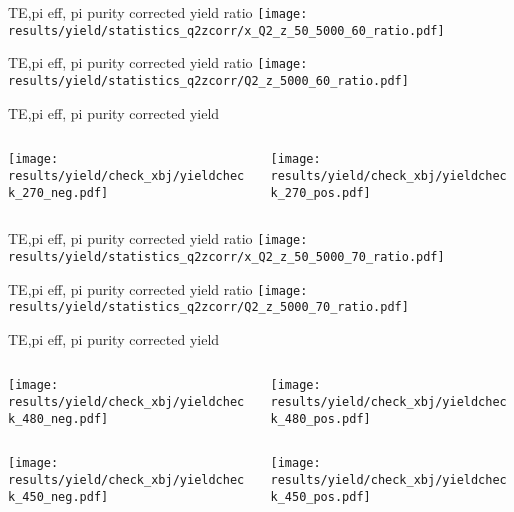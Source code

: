 \begin{frame}{TE,pi eff, pi purity corrected yield ratio}
\texttt{[image: results/yield/statistics\_q2zcorr/x\_Q2\_z\_50\_5000\_60\_ratio.pdf]}
\end{frame}
\begin{frame}{TE,pi eff, pi purity corrected yield ratio}
\texttt{[image: results/yield/statistics\_q2zcorr/Q2\_z\_5000\_60\_ratio.pdf]}
\end{frame}
\begin{frame}{TE,pi eff, pi purity corrected yield}
\begin{columns}
\begin{column}[T]{0.5\textwidth}
\texttt{[image: results/yield/check\_xbj/yieldcheck\_270\_neg.pdf]}
\end{column}
\begin{column}[T]{0.5\textwidth}
\texttt{[image: results/yield/check\_xbj/yieldcheck\_270\_pos.pdf]}
\end{column}
\end{columns}
\end{frame}
\begin{frame}{TE,pi eff, pi purity corrected yield ratio}
\texttt{[image: results/yield/statistics\_q2zcorr/x\_Q2\_z\_50\_5000\_70\_ratio.pdf]}
\end{frame}
\begin{frame}{TE,pi eff, pi purity corrected yield ratio}
\texttt{[image: results/yield/statistics\_q2zcorr/Q2\_z\_5000\_70\_ratio.pdf]}
\end{frame}
\begin{frame}{TE,pi eff, pi purity corrected yield}
\begin{columns}
\begin{column}[T]{0.5\textwidth}
\texttt{[image: results/yield/check\_xbj/yieldcheck\_480\_neg.pdf]}
\end{column}
\begin{column}[T]{0.5\textwidth}
\texttt{[image: results/yield/check\_xbj/yieldcheck\_480\_pos.pdf]}
\end{column}
\end{columns}
\begin{columns}
\begin{column}[T]{0.5\textwidth}
\texttt{[image: results/yield/check\_xbj/yieldcheck\_450\_neg.pdf]}
\end{column}
\begin{column}[T]{0.5\textwidth}
\texttt{[image: results/yield/check\_xbj/yieldcheck\_450\_pos.pdf]}
\end{column}
\end{columns}
\end{frame}
